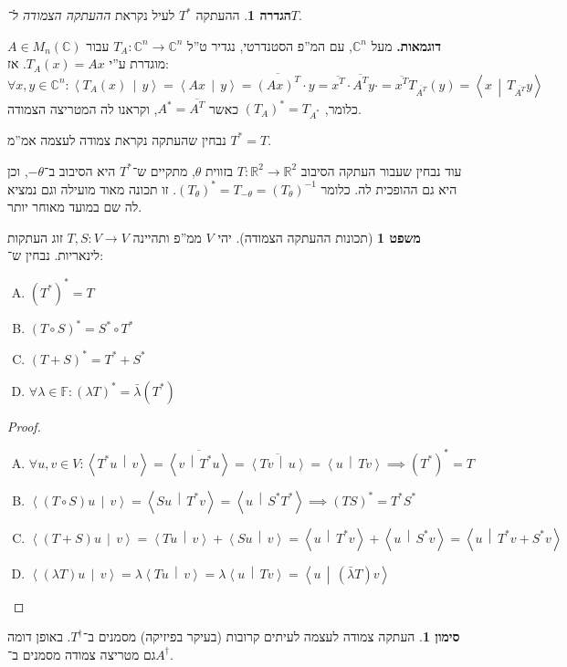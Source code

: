 \documentclass[a4paper]{article}
\newcommand\envendproof{\vspace{-16pt}}
\newcommand\R     {\mathbb{R}}
\newcommand\C     {\mathbb{C}}
\newcommand\ra    {\rangle}
\newcommand\la    {\langle}
\newcommand\ol    {\overline}
\newcommand\F         {\mathbb{F}}
\newcommand\co        {\colon}
\newcommand\mut [2]   {\left \la #1 \,\middle\vert\, #2 \right \ra}
\newcommand\tg        {\theta}
\renewcommand\lg      {\lambda}
\newcommand\op    {^{-1}}
\theoremstyle{definition}
\newtheorem{Theorem}{\color{myblue}משפט}
\newtheorem{Definition}{\color{mygreen}הגדרה}
\newtheorem{Notion}{\color{myred}סימון}
\newcommand\defi  [1] {\begin{Definition}#1\end{Definition}}
\newcommand\noti  [1] {\begin{Notion}#1\end{Notion}}
\begin{document}
	\defi{ההעתקה $T^*$ לעיל נקראת \textit{ההעתקה הצמודה ל־$T$}. }
	
	\textbf{דוגמאות. }
	מעל $\C^n$, עם המ''פ הסטנדרטי, נגדיר ט''ל $T_A \co \C^n \to \C^n$ עבור $A \in M_n(\C)$ מוגדרת ע''י $T_A(x) = Ax$. אז: 
	\[ \forall x, y \in \C^n \co \mut{T_A(x)}{y} = \mut{Ax}{y} = \ol{(Ax)^T} \cdot y = \ol{x^T}\cdot\ol{A^T}y\cdot = \ol{x^T}T_{\ol{A^T}}(y) = \mut{x}{T_{\ol{A^T}}y} \]
	כלומר, $(T_A)^* = T_{A^*}$ כאשר $A^* = \ol{A^T}$, וקראנו לה המטריצה הצמודה. 
	
	נבחין שהעתקה נקראת צמודה לעצמה אמ''מ $T^* = T$. 
	
	עוד נבחין שעבור העתקה הסיבוב $T \co \R^2 \to \R^2$ בזווית $\tg$, מתקיים ש־$T^*$ היא הסיבוב ב־$-\tg$, וכן היא גם ההופכית לה. כלומר $(T_{\tg})^* = T_{-\tg} = (T_\tg)\op$. זו תכונה מאוד מועילה וגם נמציא לה שם במועד מאוחר יותר. 
	
	\begin{Theorem}[תכונות ההעתקה הצמודה]
		יהי $V$ ממ''פ ותהיינה $T, S \co V \to V$ זוג העתקות לינאריות. נבחין ש־: 
		\begin{enumerate}[(A)]
			\item \hfil $(T^*)^* = T$
			\item \hfil $(T \circ S)^* = S^* \circ T^*$
			\item \hfil $(T + S)^* = T^* + S^*$
			\item \hfil $\forall \lg \in \F \co (\lg T)^* = \bar \lg (T^*)$
		\end{enumerate}
	\end{Theorem}
	
	\begin{proof}\,
		\begin{enumerate}[A)]
			\item \hfil $\forall u, v \in V \co \mut{T^* u}{v} = \ol{\mut{v}{T^* u}}  = \ol{\mut{Tv}{u}}  = \mut{u}{Tv} \implies (T^*)^* = T$
			\item \hfil $\mut{(T \circ S) u}{v} = \mut{Su}{T^*v} = \mut{u}{S^* T^*} \implies (TS)^* = T^*S^*$
			\item \hfil $\mut{(T + S)u}{v} = \mut{Tu}{v} + \mut{Su}{v} = \mut{u}{T^*v} + \mut{u}{S^*v}  = \mut{u}{T^*v + S^*v}$
			\item \hfil $\mut{(\lg T)u}{v} = \lg\mut{Tu}{v} = \lg \mut{u}{Tv} = \mut{u}{(\bar \lg T)v}$
		\end{enumerate}
		\envendproof
	\end{proof}
	
	\noti{העתקה צמודה לעצמה לעיתים קרובות (בעיקר בפיזיקה) מסמנים ב־$T^{\dag}$. באופן דומה גם מטריצה צמודה מסמנים ב־$A^{\dag}$. }
	
\end{document}
